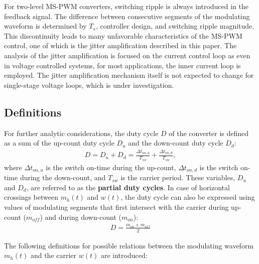 \documentclass[journal]{IEEEtran}
\begin{document}
For two-level MS-PWM converters, switching ripple is always introduced in the feedback signal. The difference between consecutive segments of the modulating waveform is determined by $T_s$, controller design, and switching ripple magnitude. This discontinuity leads to many unfavorable characteristics of the MS-PWM control, one of which is the jitter amplification described in this paper.
The analysis of the jitter amplification is focused on the current control loop as even in voltage controlled systems, for most applications, the inner current loop is employed. The jitter amplification mechanism itself is not expected to change for single-stage voltage loops, which is under investigation.

\subsection{Definitions}
For further analytic considerations, the duty cycle $D$ of the converter is defined as a sum of the up-count duty cycle $D_u$ and the down-count duty cycle $D_d$:
\begin{equation}
\begin{aligned}
D = D_u + D_d = \frac{\Delta t_{on,u}}{T_{sw}} + \frac{\Delta t_{on,d}}{T_{sw}},
\label{eq:duty_cycle_def} 
\end{aligned}    
\end{equation}
where $\Delta t_{on,u}$ is the switch on-time during the up-count, $\Delta t_{on,d}$ is the switch on-time during the down-count, and $T_{sw}$ is the carrier period. These variables, $D_u$ and $D_d$, are referred to as the \textbf{partial duty cycles}.
In case of horizontal crossings between $m_h(t)$ and $w(t)$, the duty cycle can also be expressed using values of modulating segments that first intersect with the carrier during up-count ($m_{off}$) and during down-count ($m_{on}$):
\begin{equation}
\begin{aligned}
D = \frac{m_{on}+m_{off}}{2}
\label{eq:duty_cycle_def_m} 
\end{aligned}    
\end{equation}

The following definitions for possible relations between the modulating waveform $m_h(t)$ and the carrier $w(t)$ are introduced:
\end{document}
